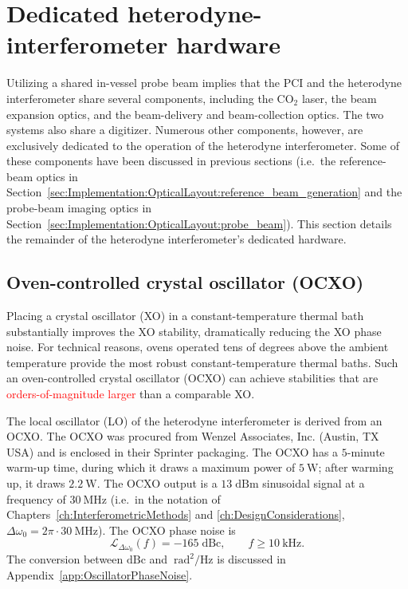 \section{Dedicated heterodyne-interferometer hardware}
\graffito{\textcolor{red}{laser parameters?}}
Utilizing a shared in-vessel probe beam implies that
the PCI and the heterodyne interferometer share several components,
including the CO$_2$ laser,
the beam expansion optics, and
the beam-delivery and beam-collection optics.
\graffito{\textcolor{red}{digitizer parameters?}}
The two systems also share a digitizer.
Numerous other components, however,
are exclusively dedicated to the operation
of the heterodyne interferometer.
Some of these components have been discussed in previous sections
(i.e.\ the reference-beam optics
in Section~\ref{sec:Implementation:OpticalLayout:reference_beam_generation}
and the probe-beam imaging optics
in Section~\ref{sec:Implementation:OpticalLayout:probe_beam}).
This section details the remainder
of the heterodyne interferometer's dedicated hardware.


\subsection{Oven-controlled crystal oscillator (OCXO)}
\label{sec:Implementation:Hardware:OCXO}
\graffito{\textcolor{red}{cite AoE?}}
Placing a crystal oscillator (XO) in a constant-temperature thermal bath
substantially improves the XO stability,
dramatically reducing the XO phase noise.
For technical reasons,
ovens operated tens of degrees above the ambient temperature
provide the most robust constant-temperature thermal baths.
Such an oven-controlled crystal oscillator (OCXO)
can achieve stabilities that are \textcolor{red}{orders-of-magnitude larger}
than a comparable XO.

The local oscillator (LO) of the heterodyne interferometer
is derived from an OCXO.
The OCXO was procured from Wenzel Associates, Inc. (Austin, TX USA)
and is enclosed in their Sprinter packaging.
The OCXO has a $5$-minute warm-up time,
during which it draws a maximum power of $\SI{5}{\watt}$;
after warming up, it draws $\SI{2.2}{\watt}$.
The OCXO output is a $13 \; \text{dBm}$ sinusoidal signal
at a frequency of $\SI{30}{\mega\hertz}$
(i.e.\ in the notation of
Chapters~\ref{ch:InterferometricMethods} and \ref{ch:DesignConsiderations},
$\Delta \omega_0 = 2 \pi \cdot \SI{30}{\mega\hertz}$).
The OCXO phase noise is
\begin{equation}
    \mathcal{L}_{\Delta \omega_0}(f)
    =
    -165 \; \text{dBc},
    \qquad
    f \geq \SI{10}{\kilo\hertz}.
  \label{eq:Implementation:OCXO_phase_noise}
\end{equation}
The conversion between $\text{dBc}$ and
$\SI{}{\radian\squared\per\hertz}$ is discussed
in Appendix~\ref{app:OscillatorPhaseNoise}.

